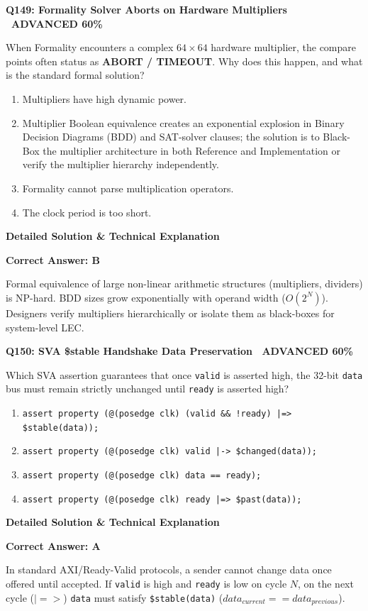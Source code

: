 \documentclass[11pt,a4paper]{article}
\newcommand{\badgeadv}{{\color{white}\colorbox{advred}{\bfseries\sffamily\tiny\ ADVANCED 60\%\ }}}
\newenvironment{qbox}[2]{%
  \begin{mdframed}[style=qstyle]%
  {\bfseries\sffamily\color{primaryblue}#1 \hfill #2}\par\vspace{2pt}%
}{%
  \end{mdframed}%
}
\newenvironment{ansbox}{%
  \begin{mdframed}[style=ansstyle]%
  {\bfseries\sffamily\color{ansgreen}\small Detailed Solution \& Technical Explanation}\par\vspace{2pt}\small%
}{%
  \end{mdframed}%
}
\begin{document}
\begin{qbox}{Q149: Formality Solver Aborts on Hardware Multipliers}{\badgeadv}
When Formality encounters a complex $64 \times 64$ hardware multiplier, the compare points often status as \textbf{ABORT / TIMEOUT}. Why does this happen, and what is the standard formal solution?
\begin{enumerate}[label=\textbf{\Alph*.}]
  \item Multipliers have high dynamic power.
  \item Multiplier Boolean equivalence creates an exponential explosion in Binary Decision Diagrams (BDD) and SAT-solver clauses; the solution is to Black-Box the multiplier architecture in both Reference and Implementation or verify the multiplier hierarchy independently.
  \item Formality cannot parse multiplication operators.
  \item The clock period is too short.
\end{enumerate}
\end{qbox}
\begin{ansbox}
\textbf{Correct Answer: B}

Formal equivalence of large non-linear arithmetic structures (multipliers, dividers) is NP-hard. BDD sizes grow exponentially with operand width ($O(2^N)$). Designers verify multipliers hierarchically or isolate them as black-boxes for system-level LEC.
\end{ansbox}

\begin{qbox}{Q150: SVA \$stable Handshake Data Preservation}{\badgeadv}
Which SVA assertion guarantees that once \texttt{valid} is asserted high, the 32-bit \texttt{data} bus must remain strictly unchanged until \texttt{ready} is asserted high?
\begin{enumerate}[label=\textbf{\Alph*.}]
  \item \texttt{assert property (@(posedge clk) (valid \&\& !ready) |=> \$stable(data));}
  \item \texttt{assert property (@(posedge clk) valid |-> \$changed(data));}
  \item \texttt{assert property (@(posedge clk) data == ready);}
  \item \texttt{assert property (@(posedge clk) ready |=> \$past(data));}
\end{enumerate}
\end{qbox}
\begin{ansbox}
\textbf{Correct Answer: A}

In standard AXI/Ready-Valid protocols, a sender cannot change data once offered until accepted. If \texttt{valid} is high and \texttt{ready} is low on cycle $N$, on the next cycle ($|=>$) \texttt{data} must satisfy \texttt{\$stable(data)} ($data_{current} == data_{previous}$).
\end{ansbox}
\end{document}
